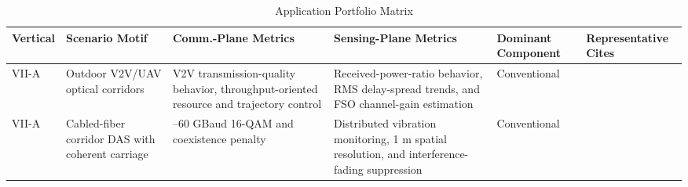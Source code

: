\documentclass[letterpaper,journal]{IEEEtran}
\begin{document}
\begin{table}[!t]
    \caption{Application Portfolio Matrix}
    \label{tab:section7_portfolio}
    \centering
    \footnotesize
    \begin{tabularx}{\textwidth}{@{}%
        >{\raggedright\arraybackslash}p{1.05cm}
        >{\raggedright\arraybackslash}X
        >{\raggedright\arraybackslash}X
        >{\raggedright\arraybackslash}X
        >{\raggedright\arraybackslash}p{1.45cm}
        >{\raggedright\arraybackslash}p{1.9cm}
        @{}}
        \toprule
        \textbf{Vertical}                                                                             &
        \textbf{Scenario Motif}                                                                       &
        \textbf{Comm.-Plane Metrics}                                                                  &
        \textbf{Sensing-Plane Metrics}                                                                &
        \textbf{Dominant Component}                                                                   &
        \textbf{Representative Cites}                                                                   \\
        \midrule

        VII-A                                                                                         &
        Outdoor V2V/UAV optical corridors                                                             &
        V2V transmission-quality behavior, throughput-oriented resource and trajectory control        &
        Received-power-ratio behavior, RMS delay-spread trends, and FSO channel-gain estimation       &
        Conventional                                                                                  &
        \cite{O_ISAC_003,O_ISAC_005}                                                                    \\

        VII-A                                                                                         &
        Cabled-fiber corridor DAS with coherent carriage                                              &
        50--60 GBaud 16-QAM and coexistence penalty                                                   &
        Distributed vibration monitoring, 1 m spatial resolution, and interference-fading suppression &
        Conventional                                                                                  &
        \cite{O_ISAC_038,O_ISAC_074}                                                                    \\


\end{tabularx}
\end{table}
\end{document}

